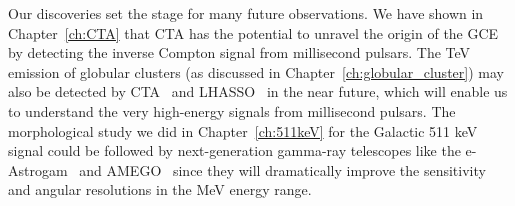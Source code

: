\documentclass[doublespace,nopageskip]{VTthesis} %
\begin{document}
Our discoveries set the stage for many future observations. We have shown in Chapter~\ref{ch:CTA} that CTA has the potential to unravel the origin of the GCE by detecting the inverse Compton signal from millisecond pulsars. The TeV emission of globular clusters (as discussed in Chapter~\ref{ch:globular_cluster}) may also be detected by CTA~\cite{2019scta.book.....C} and LHASSO~\cite{2019arXiv190502773B} in the near future, which will enable us to understand the very high-energy signals from millisecond pulsars. The morphological study we did in Chapter~\ref{ch:511keV} for the Galactic 511 keV signal could be followed by next-generation gamma-ray telescopes like the e-Astrogam~\cite{2017ExA....44...25D} and AMEGO~\cite{2019BAAS...51g.245M} since they will dramatically improve the sensitivity and angular resolutions in the MeV energy range.





% 

%    

\appendix
\end{document}
